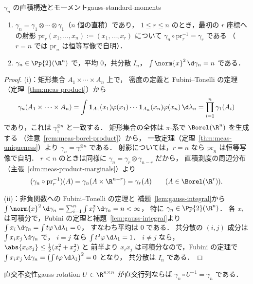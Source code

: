 \begin{claim}{$\gamma_n$ の直積構造とモーメント}{gauss-standard-moments}
  \begin{enumerate}
    \item $\gamma_n=\gamma_1\otimes\cdots\otimes\gamma_1$（$n$ 個の直積）であり，
      $1\leq r\leq n$ のとき，最初の $r$ 座標への射影
      $\mathrm{pr}_r(x_1,\dots,x_n):=(x_1,\dots,x_r)$ について
      $\gamma_n\circ\mathrm{pr}_r^{-1}=\gamma_r$ である
      （$r=n$ では $\mathrm{pr}_n$ は恒等写像で自明）．
    \item $\gamma_n\in\Pp{2}(\R^n)$ で，平均 $0$，共分散 $I_n$，
      $\int\norm{x}^2\,\d\gamma_n=n$ である．
  \end{enumerate}
\end{claim}

\begin{proof}
  (i)：矩形集合 $A_1\times\cdots\times A_n$ 上で，
  密度の定義と Fubini--Tonelli の定理（定理~\ref{thm:meas-product}）から
  \[
    \gamma_n(A_1\times\cdots\times A_n)
    =\int\mathbf{1}_{A_1}(x_1)\varphi(x_1)\cdots\mathbf{1}_{A_n}(x_n)\varphi(x_n)
      \,\d\lambda_n
    =\prod_{i=1}^n\gamma_1(A_i)
  \]
  であり，これは $\gamma_1^{\otimes n}$ と一致する．
  矩形集合の全体は $\pi$-系で $\Borel(\R^n)$ を生成する
  （注意~\ref{rem:meas-borel-product}）から，
  一致定理（定理~\ref{thm:meas-uniqueness}）より
  $\gamma_n=\gamma_1^{\otimes n}$ である．
  射影については，$r=n$ なら $\mathrm{pr}_n$ は恒等写像で自明．
  $r<n$ のときは同様に $\gamma_n=\gamma_r\otimes\gamma_{n-r}$ だから，
  直積測度の周辺分布（主張~\ref{clm:meas-product-marginals}）より
  \[
    (\gamma_n\circ\mathrm{pr}_r^{-1})(A)
    =\gamma_n(A\times\R^{n-r})
    =\gamma_r(A)
    \qquad(A\in\Borel(\R^r)).
  \]

  (ii)：非負関数への Fubini--Tonelli の定理と
  補題~\ref{lem:gauss-integral}から
  $\int\norm{x}^2\,\d\gamma_n=\sum_{i=1}^n\int x_i^2\,\d\gamma_n=n<\infty$，
  特に $\gamma_n\in\Pp{2}(\R^n)$．
  各 $x_i$ は可積分で，Fubini の定理と補題~\ref{lem:gauss-integral}より
  $\int x_i\,\d\gamma_n=\int t\varphi\,\d\lambda_1=0$，
  すなわち平均は $0$ である．
  共分散の $(i,j)$ 成分は $\int x_ix_j\,\d\gamma_n$ で，
  $i=j$ なら $\int t^2\varphi\,\d\lambda_1=1$．
  $i\neq j$ なら，$\abs{x_ix_j}\leq\frac{1}{2}(x_i^2+x_j^2)$ と
  前半より $x_ix_j$ は可積分なので，Fubini の定理で
  $\int x_ix_j\,\d\gamma_n
  =\bigl(\int t\varphi\,\d\lambda_1\bigr)^2=0$ となり，
  共分散は $I_n$ である．
\end{proof}

\begin{lemma}{直交不変性}{gauss-rotation}
  $U\in\R^{n\times n}$ が直交行列ならば
  $\gamma_n\circ U^{-1}=\gamma_n$ である．
\end{lemma}

